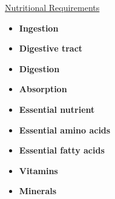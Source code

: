 \documentclass[12pt,letterpaper]{article}
\begin{document}
\hypertarget{41.1}{}
\begin{secbox}{\hyperlink{41}{Nutritional Requirements}}{
    \begin{itemize}
        \item \textbf{Ingestion}
        \item \textbf{Digestive tract}
        \item \textbf{Digestion}
        \item \textbf{Absorption}
        \item \textbf{Essential nutrient}
        \item \textbf{Essential amino acids }
        \item \textbf{Essential fatty acids }
        \item \textbf{Vitamins}
        \item \textbf{Minerals}
    \end{itemize}
}\end{secbox}
\end{document}

